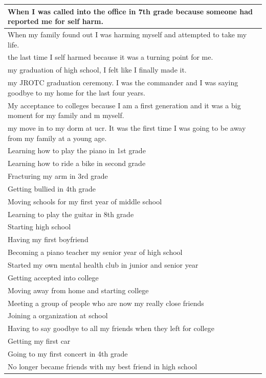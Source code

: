 \documentclass[
  .7em,
  letterpaper,
  DIV=11,
  numbers=noendperiod]{scrartcl}
\begin{document}
\begin{table}
\begin{tabular}{l}
\hline
When I was called into the office in 7th grade because someone had reported me for self harm.\\
\hline
When my family found out I was harming myself and attempted to take my life.\\
\hline
the last time I self harmed because it was a turning point for me.\\
\hline
my graduation of high school, I felt like I finally made it.\\
\hline
my JROTC graduation ceremony. I was the commander and I was saying goodbye to my home for the last four years.\\
\hline
My acceptance to colleges because I am a first generation and it was a big moment for my family and m myself.\\
\hline
my move in to my dorm at ucr. It was the first time I was going to be away from my family at a young age.\\
\hline
Learning how to play the piano in 1st grade\\
\hline
Learning how to ride a bike in second grade\\
\hline
Fracturing my arm in 3rd grade\\
\hline
Getting bullied in 4th grade\\
\hline
Moving schools for my first year of middle school\\
\hline
Learning to play the guitar in 8th grade\\
\hline
Starting high school\\
\hline
Having my first boyfriend\\
\hline
Becoming a piano teacher my senior year of high school\\
\hline
Started my own mental health club in junior and senior year\\
\hline
Getting accepted into college\\
\hline
Moving away from home and starting college\\
\hline
Meeting a group of people who are now my really close friends\\
\hline
Joining a organization at school\\
\hline
Having to say goodbye to all my friends when they left for college\\
\hline
Getting my first car\\
\hline
Going to my first concert in 4th grade\\
\hline
No longer became friends with my best friend in high school\\

\end{tabular}
\end{table}
\end{document}
